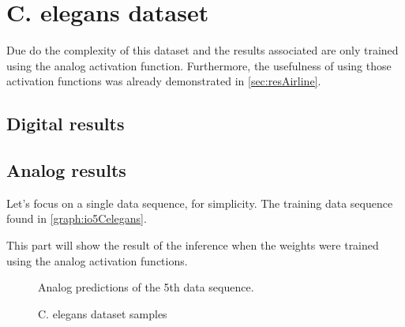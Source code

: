 \section{\acs{C. elegans} dataset}
\label{sec:resCelegans}

Due do the complexity of this dataset and the results associated are only trained using the analog activation function. Furthermore, the usefulness of using those activation functions was already demonstrated in \cref{sec:resAirline}.

\subsection{Digital results}
\label{subsec:digitalCelegans}

\subsection{Analog results}

Let's focus on a single data sequence, for simplicity. The training data sequence found in \cref{graph:io5Celegans}.

This part will show the result of the inference when the weights were trained using the analog activation functions.

\begin{figure}[H]
  \centering
  
  \caption{Analog predictions of the 5th data sequence.}
  \label{graph:celegansAnalog0}
\end{figure}

\begin{figure}[H]
  \centering
  \begin{minipage}{\columnwidth}
    \hfill
  \end{minipage}
  \begin{minipage}{\columnwidth}
    \hfill
  \end{minipage}
  \caption{\ac{C. elegans} dataset samples}
  \label{graph:celegans}
\end{figure}

